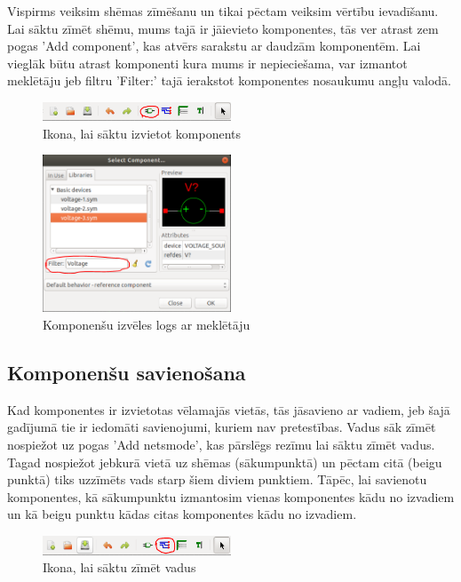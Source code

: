 \documentclass{article}
\begin{document}
Vispirms veiksim shēmas zīmēšanu un tikai pēctam veiksim vērtību ievadīšanu. Lai sāktu zīmēt shēmu, mums tajā ir jāievieto komponentes, tās ver atrast zem pogas {\large \textsf{'Add component'}}, kas atvērs sarakstu ar daudzām komponentēm. Lai vieglāk būtu atrast komponenti kura mums ir nepieciešama, var izmantot meklētāju jeb filtru {\large \textsf{'Filter:'}} tajā ierakstot komponentes nosaukumu angļu valodā.

\begin{figure}[H]\centering\includegraphics[width=0.50\textwidth]{pictures/spice/Components.PNG}\caption{Ikona, lai sāktu izvietot komponents}\label{picture:10lw2p}\end{figure}
\begin{figure}[H]\centering\includegraphics[width=0.50\textwidth]{pictures/spice/ComponentFilter.PNG}\caption{Komponenšu izvēles logs ar meklētāju}\label{picture:10lw3p}\end{figure}

\subsection{Komponenšu savienošana}

Kad komponentes ir izvietotas vēlamajās vietās, tās jāsavieno ar vadiem, jeb šajā gadījumā tie ir iedomāti savienojumi, kuriem nav pretestības. Vadus sāk zīmēt nospiežot uz pogas {\large \textsf{'Add netsmode'}}, kas pārslēgs rezīmu lai sāktu zīmēt vadus. Tagad nospiežot jebkurā vietā uz shēmas (sākumpunktā) un pēctam citā (beigu punktā) tiks uzzīmēts vads starp šiem diviem punktiem. Tāpēc, lai savienotu komponentes, kā sākumpunktu izmantosim vienas komponentes kādu no izvadiem un kā beigu punktu kādas citas komponentes kādu no izvadiem.

\begin{figure}[H]\centering\includegraphics[width=0.50\textwidth]{pictures/spice/Netnodes.PNG}\caption{Ikona, lai sāktu zīmēt vadus}\label{picture:10lw4p}\end{figure}
\end{document}
